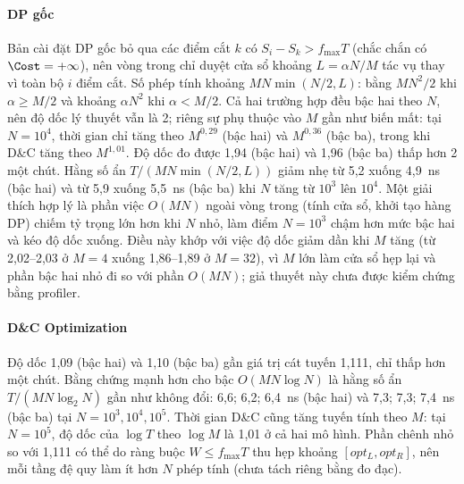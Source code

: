 \paragraph{DP gốc}
Bản cài đặt DP gốc bỏ qua các điểm cắt $k$ có $S_i - S_k > f_{\max} T$ (chắc chắn có $\Cost = +\infty$),
nên vòng trong chỉ duyệt cửa sổ khoảng $L = \alpha N / M$ tác vụ thay vì toàn bộ $i$ điểm cắt.
Số phép tính khoảng $M N \min(N/2, L)$: bằng $MN^2/2$ khi $\alpha \ge M/2$ và khoảng $\alpha N^2$ khi $\alpha < M/2$.
Cả hai trường hợp đều bậc hai theo $N$, nên độ dốc lý thuyết vẫn là 2;
riêng sự phụ thuộc vào $M$ gần như biến mất: tại $N = 10^4$, thời gian chỉ tăng theo $M^{0{,}29}$ (bậc hai)
và $M^{0{,}36}$ (bậc ba), trong khi D\&C tăng theo $M^{1{,}01}$.
Độ dốc đo được 1{,}94 (bậc hai) và 1{,}96 (bậc ba) thấp hơn 2 một chút.
Hằng số ẩn $T / (MN\min(N/2, L))$ giảm nhẹ từ 5{,}2 xuống 4{,}9~ns (bậc hai) và từ 5{,}9 xuống 5{,}5~ns (bậc ba)
khi $N$ tăng từ $10^3$ lên $10^4$.
Một giải thích hợp lý là phần việc $O(MN)$ ngoài vòng trong (tính cửa sổ, khởi tạo hàng DP) chiếm tỷ trọng lớn hơn
khi $N$ nhỏ, làm điểm $N = 10^3$ chậm hơn mức bậc hai và kéo độ dốc xuống.
Điều này khớp với việc độ dốc giảm dần khi $M$ tăng (từ 2{,}02--2{,}03 ở $M = 4$ xuống 1{,}86--1{,}89 ở $M = 32$),
vì $M$ lớn làm cửa sổ hẹp lại và phần bậc hai nhỏ đi so với phần $O(MN)$; giả thuyết này chưa được kiểm chứng bằng profiler.

\paragraph{D\&C Optimization}
Độ dốc 1{,}09 (bậc hai) và 1{,}10 (bậc ba) gần giá trị cát tuyến 1{,}111, chỉ thấp hơn một chút.
Bằng chứng mạnh hơn cho bậc $O(MN\log N)$ là hằng số ẩn $T / (MN\log_2 N)$ gần như không đổi:
6{,}6; 6{,}2; 6{,}4~ns (bậc hai) và 7{,}3; 7{,}3; 7{,}4~ns (bậc ba) tại $N = 10^3, 10^4, 10^5$.
Thời gian D\&C cũng tăng tuyến tính theo $M$: tại $N = 10^5$, độ dốc của $\log T$ theo $\log M$ là 1{,}01 ở cả hai mô hình.
Phần chênh nhỏ so với 1{,}111 có thể do ràng buộc $W \le f_{\max} T$ thu hẹp khoảng $[opt_L, opt_R]$,
nên mỗi tầng đệ quy làm ít hơn $N$ phép tính (chưa tách riêng bằng đo đạc).

